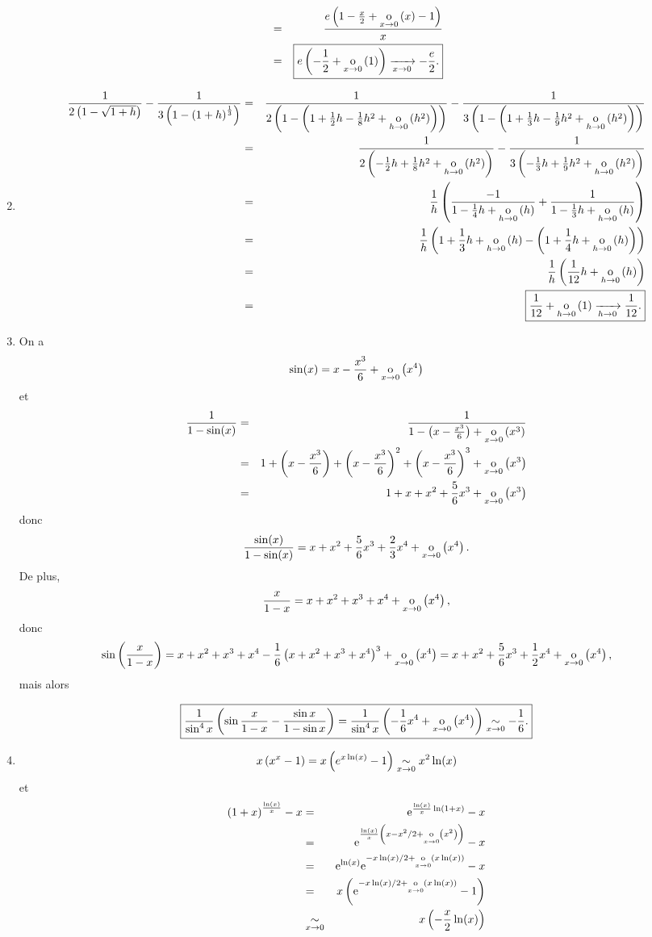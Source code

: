 \documentclass{magnolia}
\begin{document}
\begin{sol}
\begin{enumerate}
\begin{eqnarray*}
&=&\frac{e\p{1-\frac{x}{2}+\petitozero{x}{x}-1}}{x}\\
&=&\boxed{e\p{-\frac{1}{2}+\petitozero{x}{1}}\tendvers{x}{0}{-\frac{e}{2}}.}
\end{eqnarray*}
\item 
\begin{eqnarray*}
\frac{1}{2\p{1-\sqrt{1+h}}}-\frac{1}{3\p{1-\p{1+h}^{\frac{1}{3}}}}&=&\frac{1}{2\p{1-\p{1+\frac{1}{2}h-\frac{1}{8}h^2+\petitozero{h}{h^2}}}}-\frac{1}{3\p{1-\p{1+\frac{1}{3}h-\frac{1}{9}h^2+\petitozero{h}{h^2}}}}\\
&=&\frac{1}{2\p{-\frac{1}{2}h+\frac{1}{8}h^2+\petitozero{h}{h^2}}}-\frac{1}{3\p{-\frac{1}{3}h+\frac{1}{9}h^2+\petitozero{h}{h^2}}}\\
&=&\frac{1}{h}\p{\frac{-1}{1-\frac{1}{4}h+\petitozero{h}{h}}+\frac{1}{1-\frac{1}{3}h+\petitozero{h}{h}}}\\
&=&\frac{1}{h}\p{1+\frac{1}{3}h+\petitozero{h}{h}-\p{1+\frac{1}{4}h+\petitozero{h}{h}}}\\
&=&\frac{1}{h}\p{\frac{1}{12}h+\petitozero{h}{h}}\\
&=&\boxed{\frac{1}{12}+\petitozero{h}{1}\tendvers{h}{0}{\frac{1}{12}}.}
\end{eqnarray*}
\item On a $$\sin(x)=x-\frac{x^3}{6}+\petitozero{x}{x^4}$$
et 
\begin{eqnarray*}
\frac{1}{1-\sin(x)}&=&\frac{1}{1-\p{x-\frac{x^3}{6}}+\petitozero{x}{x^3}}\\
&=&1+\p{x-\frac{x^3}{6}}+\p{x-\frac{x^3}{6}}^2+\p{x-\frac{x^3}{6}}^3+\petitozero{x}{x^3}\\
&=&1+x+x^2+\frac{5}{6}x^3+\petitozero{x}{x^3}
\end{eqnarray*}
donc 
$$\frac{\sin(x)}{1-\sin(x)}=x+x^2+\frac{5}{6}x^3+\frac{2}{3}x^4+\petitozero{x}{x^4}.$$
De plus, $$\frac{x}{1-x}=x+x^2+x^3+x^4+\petitozero{x}{x^4},$$
donc $$\sin\p{\frac{x}{1-x}}=x+x^2+x^3+x^4-\frac{1}{6}\p{x+x^2+x^3+x^4}^3+\petitozero{x}{x^4}=x+x^2+\frac{5}{6}x^3+\frac{1}{2}x^4+\petitozero{x}{x^4},$$
mais alors

$$\boxed{\frac{1}{\sin^4 x}\p{\sin\frac{x}{1-x}-\frac{\sin x}{1-\sin x}}=\frac{1}{\sin^4 x}\p{-\frac{1}{6}x^4+\petitozero{x}{x^4}}\equi{x}{0}{-\frac{1}{6}}.}$$

\item $$x\p{x^x-1}=x\p{e^{x\ln(x)}-1}\equi{x}{0}{x^2\ln(x)}$$
et 
\begin{eqnarray*}
\p{1+x}^{\frac{\ln(x)}{x}}-x&=& \e^{\frac{\ln(x)}{x}\ln(1+x)}-x\\
&=& \e^{\frac{\ln(x)}{x}\p{x-x^2/2+\petitozero{x}{x^2}}}-x\\
&=&\e^{\ln(x)}\e^{-x\ln(x)/2+\petitozero{x}{x\ln(x)}}-x\\
&=&x\p{\e^{-x\ln(x)/2+\petitozero{x}{x\ln(x)}}-1}\\
&\equi{x}{0}&x\p{-\frac{x}{2}\ln(x)}
\end{eqnarray*}
\end{enumerate}

\end{sol}
\end{document}
